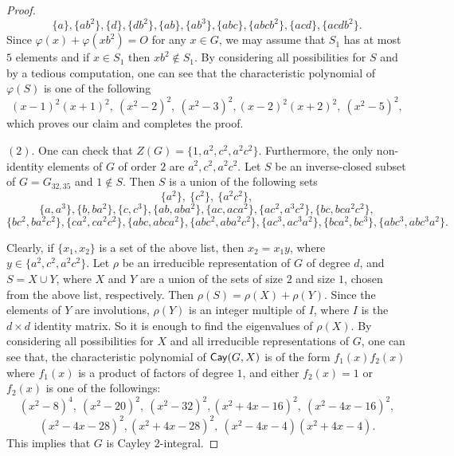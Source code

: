 \documentclass{amsart}
\def\Cay{{\sf Cay}} \def\Ker{{\sf Ker}}
\begin{document}
\begin{proof}
	$$\{ a \},  \{ ab^2 \},\{ d \}, \{ db^2 \}, \{ ab \}, \{ ab^3 \},	\{ abc \}, \{ abcb^2 \}, \{ acd \},  \{ acdb^2 \}.$$
	Since $\varphi(x)+\varphi(xb^2)=O$ for any $x\in G$, we may assume that $S_1$ has at most $5$ elements and if $x\in S_1$ then $xb^2\notin S_1$. By considering all possibilities for $S$ and by a tedious computation, one can see that the characteristic polynomial of $\varphi(S)$ is one of the following
	\[ (x-1)^2(x+1)^2,~ (x^2-2)^2,~(x^2-3)^2, (x-2)^2(x+2)^2,~(x^2-5)^2,\]
	which proves our claim and completes the proof.
	
	$(2)$. One can check that $Z(G)=\{1,a^2,c^2,a^2c^2\}$.  Furthermore, the only non-identity elements of $G$ of order $2$ are $a^2,c^2,a^2c^2$.  Let $S$ be an inverse-closed subset of $G=G_{32,35}$ and $1\notin S$. Then
	$S$ is a union of the following sets
	$$\{a^2\},~\{c^2\},~\{a^2c^2\},$$
	$$
	\{a, a^3\},
	\{b, ba^2\},
	\{ c, c^3\},
	\{ab, aba^2\},
	\{ac, aca^2\},
	\{ ac^2, a^3c^2\},
	\{ bc, bca^2c^2\},$$
	$$
	\{bc^2, ba^2c^2\},
	\{ca^2, ca^2c^2\},
	\{abc, abca^2\},
	\{abc^2, aba^2c^2\},
	\{ac^3, ac^3a^2\},
	\{bca^2, bc^3\},
	\{abc^3, abc^3a^2\}.
	$$
	
	Clearly, if $\{x_1,x_2\}$ is a set of the above list, then $x_2=x_1y$, where $y\in\{a^2,c^2,a^2c^2\}$. Let $\rho$ be an irreducible representation of $G$ of degree $d$, and $S=X\cup Y$, where $X$ and $Y$ are a union of the sets of size $2$ and size $1$, chosen from the above list,  respectively. Then $\rho(S)=\rho(X)+\rho(Y)$. Since the elements of $Y$ are involutions, $\rho(Y)$ is an integer multiple of  $I$, where $I$ is the $d\times d$ identity matrix. So it is enough to find the eigenvalues of $\rho(X)$. By considering all possibilities for $X$ and all irreducible representations of $G$, one can see that, the characteristic polynomial of $\Cay(G,X)$ is of the form $f_1(x)f_2(x)$ where $f_1(x)$ is a product of factors of degree $1$, and either $f_2(x)=1$ or $f_2(x)$ is one of the followings:
	\[(x^2-8)^4,~(x^2-20)^2,~(x^2-32)^2,(x^2+4x-16)^2,~(x^2-4x-16)^2,\]
	\[(x^2-4x-28)^2,(x^2+4x-28)^2,~(x^2-4x-4)(x^2+4x-4).\]
	This implies that $G$ is Cayley $2$-integral.
	

\end{proof}
\end{document}
